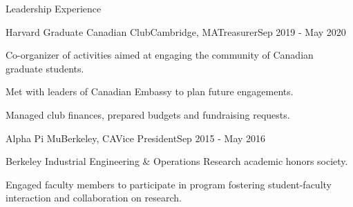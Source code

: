 \documentclass{resume} %
\begin{document}
\begin{rSection}{Leadership Experience}

\begin{rSubsection}{Harvard Graduate Canadian Club}{Cambridge, MA}{Treasurer}{Sep 2019 - May 2020}

\item Co-organizer of activities aimed at engaging the community of Canadian graduate students.
\item Met with leaders of Canadian Embassy to plan future engagements.
\item Managed club finances, prepared budgets and fundraising requests.

\end{rSubsection}

\begin{rSubsection}{Alpha Pi Mu}{Berkeley, CA}{Vice President}{Sep 2015 - May 2016}

\item Berkeley Industrial Engineering \& Operations Research academic honors society.
\item Engaged faculty members to participate in program fostering student-faculty interaction and collaboration on research.

\end{rSubsection}




\end{rSection}

\end{document}
